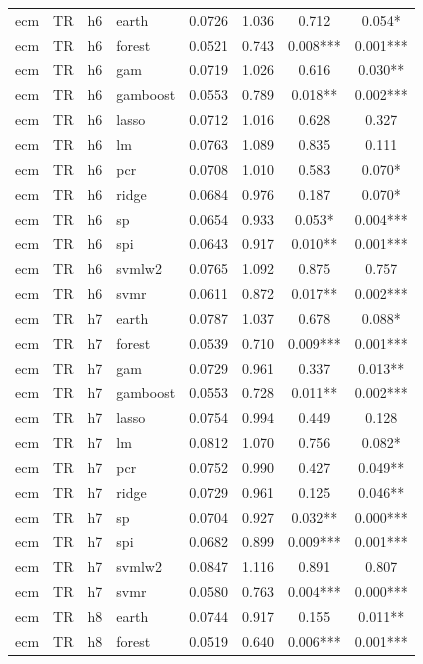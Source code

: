 \begin{ThreePartTable}
\begin{longtable}[t]{llclcccc}
ecm & TR & h6 & earth & 0.0726 & 1.036 & 0.712 & 0.054*\\
ecm & TR & h6 & forest & 0.0521 & 0.743 & 0.008*** & 0.001***\\
ecm & TR & h6 & gam & 0.0719 & 1.026 & 0.616 & 0.030**\\
ecm & TR & h6 & gamboost & 0.0553 & 0.789 & 0.018** & 0.002***\\
ecm & TR & h6 & lasso & 0.0712 & 1.016 & 0.628 & 0.327\\
ecm & TR & h6 & lm & 0.0763 & 1.089 & 0.835 & 0.111\\
ecm & TR & h6 & pcr & 0.0708 & 1.010 & 0.583 & 0.070*\\
ecm & TR & h6 & ridge & 0.0684 & 0.976 & 0.187 & 0.070*\\
ecm & TR & h6 & sp & 0.0654 & 0.933 & 0.053* & 0.004***\\
ecm & TR & h6 & spi & 0.0643 & 0.917 & 0.010** & 0.001***\\
ecm & TR & h6 & svmlw2 & 0.0765 & 1.092 & 0.875 & 0.757\\
ecm & TR & h6 & svmr & 0.0611 & 0.872 & 0.017** & 0.002***\\
\addlinespace
ecm & TR & h7 & earth & 0.0787 & 1.037 & 0.678 & 0.088*\\
ecm & TR & h7 & forest & 0.0539 & 0.710 & 0.009*** & 0.001***\\
ecm & TR & h7 & gam & 0.0729 & 0.961 & 0.337 & 0.013**\\
ecm & TR & h7 & gamboost & 0.0553 & 0.728 & 0.011** & 0.002***\\
ecm & TR & h7 & lasso & 0.0754 & 0.994 & 0.449 & 0.128\\
ecm & TR & h7 & lm & 0.0812 & 1.070 & 0.756 & 0.082*\\
ecm & TR & h7 & pcr & 0.0752 & 0.990 & 0.427 & 0.049**\\
ecm & TR & h7 & ridge & 0.0729 & 0.961 & 0.125 & 0.046**\\
ecm & TR & h7 & sp & 0.0704 & 0.927 & 0.032** & 0.000***\\
ecm & TR & h7 & spi & 0.0682 & 0.899 & 0.009*** & 0.001***\\
ecm & TR & h7 & svmlw2 & 0.0847 & 1.116 & 0.891 & 0.807\\
ecm & TR & h7 & svmr & 0.0580 & 0.763 & 0.004*** & 0.000***\\
\addlinespace
ecm & TR & h8 & earth & 0.0744 & 0.917 & 0.155 & 0.011**\\
ecm & TR & h8 & forest & 0.0519 & 0.640 & 0.006*** & 0.001***\\

\end{longtable}
\end{ThreePartTable}
